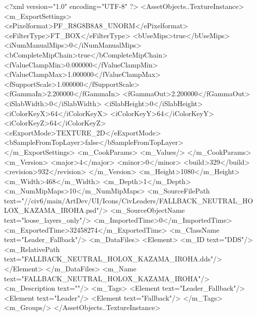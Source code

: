 <?xml version="1.0" encoding="UTF-8" ?>
<AssetObjects..TextureInstance>
	<m_ExportSettings>
		<ePixelformat>PF_R8G8B8A8_UNORM</ePixelformat>
		<eFilterType>FT_BOX</eFilterType>
		<bUseMips>true</bUseMips>
		<iNumManualMips>0</iNumManualMips>
		<bCompleteMipChain>true</bCompleteMipChain>
		<fValueClampMin>0.000000</fValueClampMin>
		<fValueClampMax>1.000000</fValueClampMax>
		<fSupportScale>1.000000</fSupportScale>
		<fGammaIn>2.200000</fGammaIn>
		<fGammaOut>2.200000</fGammaOut>
		<iSlabWidth>0</iSlabWidth>
		<iSlabHeight>0</iSlabHeight>
		<iColorKeyX>64</iColorKeyX>
		<iColorKeyY>64</iColorKeyY>
		<iColorKeyZ>64</iColorKeyZ>
		<eExportMode>TEXTURE_2D</eExportMode>
		<bSampleFromTopLayer>false</bSampleFromTopLayer>
	</m_ExportSettings>
	<m_CookParams>
		<m_Values/>
	</m_CookParams>
	<m_Version>
		<major>4</major>
		<minor>0</minor>
		<build>329</build>
		<revision>932</revision>
	</m_Version>
	<m_Height>1080</m_Height>
	<m_Width>468</m_Width>
	<m_Depth>1</m_Depth>
	<m_NumMipMaps>10</m_NumMipMaps>
	<m_SourceFilePath text="//civ6/main/ArtDev/UI/Icons/CivLeaders/FALLBACK_NEUTRAL_HOLOX_KAZAMA_IROHA.psd"/>
	<m_SourceObjectName text="loose_layers_only"/>
	<m_ImportedTime>0</m_ImportedTime>
	<m_ExportedTime>32458274</m_ExportedTime>
	<m_ClassName text="Leader_Fallback"/>
	<m_DataFiles>
		<Element>
			<m_ID text="DDS"/>
			<m_RelativePath text="FALLBACK_NEUTRAL_HOLOX_KAZAMA_IROHA.dds"/>
		</Element>
	</m_DataFiles>
	<m_Name text="FALLBACK_NEUTRAL_HOLOX_KAZAMA_IROHA"/>
	<m_Description text=""/>
	<m_Tags>
		<Element text="Leader_Fallback"/>
		<Element text="Leader"/>
		<Element text="Fallback"/>
	</m_Tags>
	<m_Groups/>
</AssetObjects..TextureInstance>

